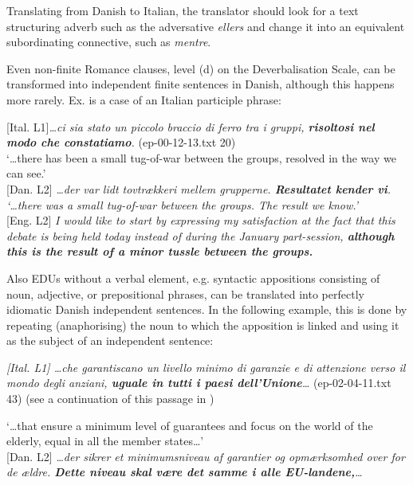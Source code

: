 \documentclass[output=paper]{LSP/langsci}
\begin{document}
Translating from Danish to Italian, the translator should look for a text structuring adverb such as the adversative \textit{ellers} and change it into an equivalent subordinating connective, such as \textit{mentre}. 

\textup{Even non-finite Romance clauses, level (d) on the Deverbalisation Scale, can be transformed into independent finite sentences in Danish, although this happens more rarely. }\textup{Ex.  is a case of an Italian participle phrase:}

\ea\label{ex:korzen:16}
\textup{[Ital. L1]}\textit{\ldots ci sia stato un piccolo braccio di ferro tra i gruppi, \textbf{risoltosi nel modo che constatiamo}.} \textup{(ep-00-12-13.txt 20)}\\
  `\ldots there has been a small tug-of-war between the groups, resolved in the way we can see.'\\
 \textup{[Dan. L2]} \textit{\ldots der var lidt tovtrækkeri mellem grupperne. \textbf{Resultatet kender vi}.}\\
 \textit{ `\ldots there was a small tug-of-war between the groups. The result we know.'}\\
\textup{[Eng. L2]} \textit{I would like to start by expressing my satisfaction at the fact that this debate is being held today instead of during the January part-session, \textbf{although this is the result of a minor tussle between the groups.}}
\z

\textup{Also EDUs without a verbal element, e.g. syntactic appositions consisting of noun, adjective, or prepositional phrases, can be translated into perfectly idiomatic Danish independent sentences. In the following example, this is done by repeating (anaphorising) the noun to which the apposition is linked and using it as the subject of an independent sentence:}

\ea\label{ex:korzen:17}
\textit{\textup{[Ital. L1]} \ldots che garantiscano un livello minimo di garanzie e di attenzione verso il mondo degli anziani, \textbf{uguale in tutti i paesi dell'Unione}\ldots } \textup{(ep-02-04-11.txt 43)} \textup{(see a continuation of this passage in )}

  `\ldots that ensure a minimum level of guarantees and focus on the world of the elderly, equal in all the member states\ldots ' \\

\textup{[Dan. L2]} \textit{\ldots der sikrer et minimumsniveau af garantier og opmærksomhed over for de ældre. \textbf{Dette niveau skal være det samme i alle EU-landene,}\ldots} \\
\end{document}

